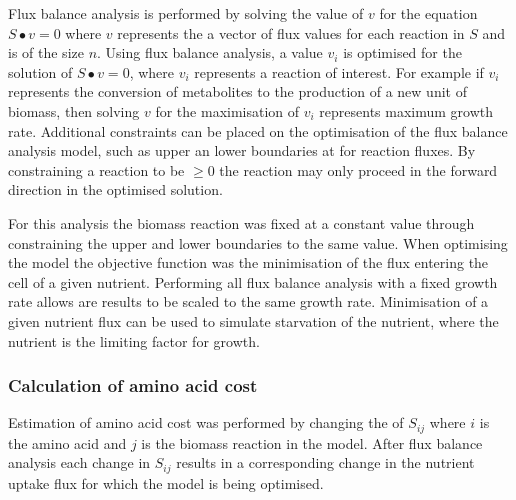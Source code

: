 Flux balance analysis is performed by solving the value of $v$ for the equation $S \bullet v = 0$ where $v$ represents the a vector of flux values for each reaction in $S$ and is of the size $n$. Using flux balance analysis, a value $v_{i}$ is optimised for the solution of $S \bullet v = 0$, where $v_{i}$ represents a reaction of interest. For example if $v_{i}$ represents the conversion of metabolites to the production of a new unit of biomass, then solving $v$ for the maximisation of $v_{i}$ represents maximum growth rate. Additional constraints can be placed on the optimisation of the flux balance analysis model, such as upper an lower boundaries at for reaction fluxes. By constraining a reaction to be $\geq 0$ the reaction may only proceed in the forward direction in the optimised solution.

For this analysis the biomass reaction was fixed at a constant value through constraining the upper and lower boundaries to the same value. When optimising the model the objective function was the minimisation of the flux entering the cell of a given nutrient. Performing all flux balance analysis with a fixed growth rate allows are results to be scaled to the same growth rate. Minimisation of a given nutrient flux can be used to simulate starvation of the nutrient, where the nutrient is the limiting factor for growth.

\subsubsection{Calculation of amino acid cost}

Estimation of amino acid cost was performed by changing the of $S_{ij}$ where $i$ is the amino acid and $j$ is the biomass reaction in the model. After flux balance analysis each change in $S_{ij}$ results in a corresponding change in the nutrient uptake flux for which the model is being optimised.
